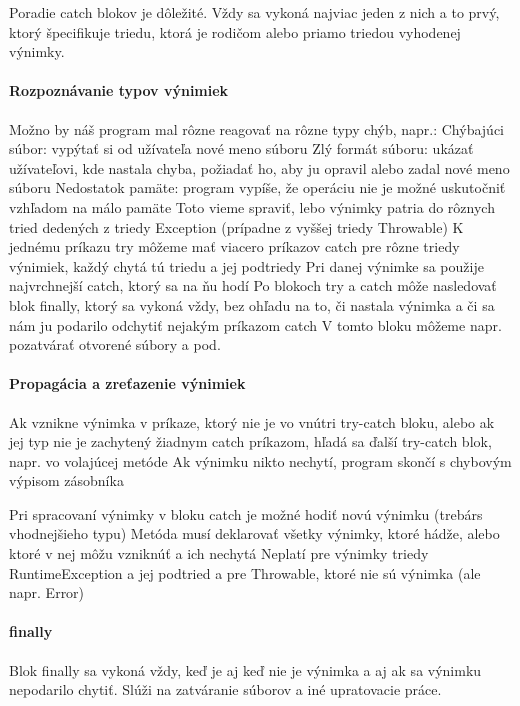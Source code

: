 Poradie catch blokov je dôležité. Vždy sa vykoná najviac jeden z nich a to prvý, ktorý špecifikuje triedu, ktorá je rodičom alebo priamo triedou vyhodenej výnimky.



	\paragraph{Rozpoznávanie typov výnimiek}
	Možno by náš program mal rôzne reagovať na rôzne typy chýb, napr.:
	Chýbajúci súbor: vypýtať si od užívateľa nové meno súboru
	Zlý formát súboru: ukázať užívateľovi, kde nastala chyba, požiadať ho, aby ju opravil alebo zadal nové meno súboru
	Nedostatok pamäte: program vypíše, že operáciu nie je možné uskutočniť vzhľadom na málo pamäte
	Toto vieme spraviť, lebo výnimky patria do rôznych tried dedených z triedy Exception (prípadne z vyššej triedy Throwable)
	K jednému príkazu try môžeme mať viacero príkazov catch pre rôzne triedy výnimiek, každý chytá tú triedu a jej podtriedy
	Pri danej výnimke sa použije najvrchnejší catch, ktorý sa na ňu hodí
	Po blokoch try a catch môže nasledovať blok finally, ktorý sa vykoná vždy, bez ohľadu na to, či nastala výnimka a či sa nám ju podarilo odchytiť nejakým príkazom catch
	V tomto bloku môžeme napr. pozatvárať otvorené súbory a pod.


	\paragraph{Propagácia a zreťazenie výnimiek}
	Ak vznikne výnimka v príkaze, ktorý nie je vo vnútri try-catch bloku, alebo ak jej typ nie je zachytený žiadnym catch príkazom, hľadá sa ďalší try-catch blok, napr. vo volajúcej metóde
	Ak výnimku nikto nechytí, program skončí s chybovým výpisom zásobníka

	Pri spracovaní výnimky v bloku catch je možné hodiť novú výnimku (trebárs vhodnejšieho typu)
	Metóda musí deklarovať všetky výnimky, ktoré hádže, alebo ktoré v nej môžu vzniknúť a ich nechytá
	Neplatí pre výnimky triedy RuntimeException a jej podtried a pre Throwable, ktoré nie sú výnimka (ale napr. Error)

	\paragraph{finally}
	Blok finally sa vykoná vždy, keď je aj keď nie je výnimka a aj ak sa výnimku nepodarilo chytiť. Slúži na zatváranie súborov a iné upratovacie práce.


